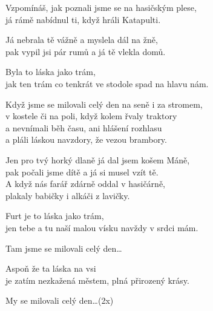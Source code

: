 \ve{}
Vzpomínáš, jak poznali jsme se na hasičským plese,\\
já rámě nabídnul ti, když hráli Katapulti. 

Já nebrala tě vážně a myslela dál na žně,\\
pak vypil jsi pár rumů a já tě vlekla domů. 

\re{*:}
Byla to láska jako trám,\\
jak ten trám co tenkrát ve stodole spad na hlavu nám. 
 
\cho{}
Když jsme se milovali celý den na seně i za stromem,\\
v kostele či na poli, když kolem řvaly traktory\\
a nevnímali běh času, ani hlášení rozhlasu\\
a pláli láskou navzdory, že vezou brambory. 

\ve{}
Jen pro tvý horký dlaně já dal jsem košem Máně,\\
pak počali jsme dítě a já si musel vzít tě.\\
A když nás farář zdárně oddal v hasičárně,\\
plakaly babičky i alkáči z lavičky.

\re{*:}
Furt je to láska jako trám,\\
jen tebe a tu naší malou vísku navždy v srdci mám. 
 
\cho{}
Tam jsme se milovali celý den\ldots 

\re{*:}
Aspoň že ta láska na vsi\\
je zatím nezkažená městem, plná přirozený krásy. 
 
\cho{}
My se milovali celý den\ldots (2x)

\esong